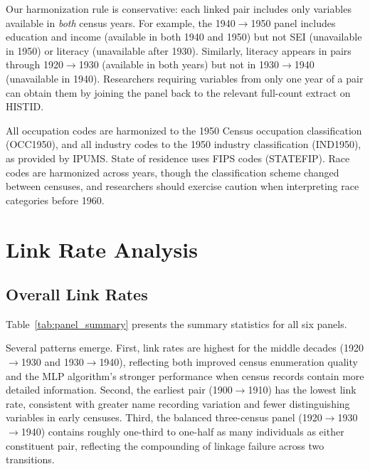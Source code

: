 \documentclass[12pt]{article}
\begin{document}


Our harmonization rule is conservative: each linked pair includes only variables available in \textit{both} census years. For example, the 1940$\rightarrow$1950 panel includes education and income (available in both 1940 and 1950) but not SEI (unavailable in 1950) or literacy (unavailable after 1930). Similarly, literacy appears in pairs through 1920$\rightarrow$1930 (available in both years) but not in 1930$\rightarrow$1940 (unavailable in 1940). Researchers requiring variables from only one year of a pair can obtain them by joining the panel back to the relevant full-count extract on HISTID.

All occupation codes are harmonized to the 1950 Census occupation classification (OCC1950), and all industry codes to the 1950 industry classification (IND1950), as provided by IPUMS. State of residence uses FIPS codes (STATEFIP). Race codes are harmonized across years, though the classification scheme changed between censuses, and researchers should exercise caution when interpreting race categories before 1960.


\section{Link Rate Analysis}\label{sec:linkrates}

\subsection{Overall Link Rates}

Table~\ref{tab:panel_summary} presents the summary statistics for all six panels.



Several patterns emerge. First, link rates are highest for the middle decades (1920$\rightarrow$1930 and 1930$\rightarrow$1940), reflecting both improved census enumeration quality and the MLP algorithm's stronger performance when census records contain more detailed information. Second, the earliest pair (1900$\rightarrow$1910) has the lowest link rate, consistent with greater name recording variation and fewer distinguishing variables in early censuses. Third, the balanced three-census panel (1920$\rightarrow$1930$\rightarrow$1940) contains roughly one-third to one-half as many individuals as either constituent pair, reflecting the compounding of linkage failure across two transitions.
\end{document}
